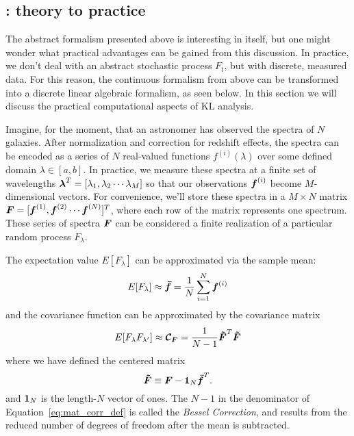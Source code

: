 \subsection{\KL: theory to practice}
The abstract formalism presented above is interesting in itself, but one
might wonder what practical advantages can be gained from this discussion.
In practice, we don't deal with an abstract stochastic process $F_t$, but
with discrete, measured data.  For this reason, the continuous formalism
from above can be transformed into a discrete linear algebraic formalism,
as seen below.  In this section we will discuss the
practical computational aspects of KL analysis.

Imagine, for the moment, that an astronomer has observed the spectra of
$N$ galaxies.  After normalization and correction for redshift effects,
the spectra can be encoded as a series of $N$ real-valued functions
$f^{(i)}(\lambda)$ over some defined domain $\lambda \in [a, b]$.
In practice, we measure these spectra at a finite set of wavelengths
$\boldsymbol{\lambda}^T = [\lambda_1, \lambda_2 \cdots \lambda_M]$ so that
our observations $\boldsymbol{f}^{(i)}$ become $M$-dimensional vectors.  For
convenience, we'll store these spectra in a $M \times N$ matrix
$\boldsymbol{F} = [\boldsymbol{f}^{(1)}, \boldsymbol{f}^{(2)} \cdots \boldsymbol{f}^{(N)}]^T$,
where each row of the matrix represents one spectrum.
These series of spectra $\boldsymbol{F}$ 
can be considered a finite realization of a particular
random process $F_\lambda$.

The expectation value $E[F_\lambda]$ can be approximated via the sample mean:
\begin{equation}
  E[F_\lambda] \approx \boldsymbol{\bar{f}}
  = \frac{1}{N} \sum_{i=1}^N \boldsymbol{f}^{(i)}
\end{equation}
and the covariance function can be approximated by the covariance matrix
\begin{equation}
  \label{eq:mat_corr_def}
  E[F_\lambda F_{\lambda^\prime}] \approx 
  \boldsymbol{\mathcal{C}_F} = \frac{1}{N - 1} \boldsymbol{\tilde{F}}^T \boldsymbol{\tilde{F}}
\end{equation}
where we have defined the centered matrix
\begin{equation}
  \boldsymbol{\tilde{F}} \equiv \boldsymbol{F} - \boldsymbol{1}_N\boldsymbol{\bar{f}}^T.
\end{equation}
and $\boldsymbol{1}_N$ is the length-$N$ vector of ones.  The $N-1$ in the
denominator of Equation~\ref{eq:mat_corr_def} is called the
{\it Bessel Correction}, and results from the reduced number of degrees of
freedom after the mean is subtracted.

